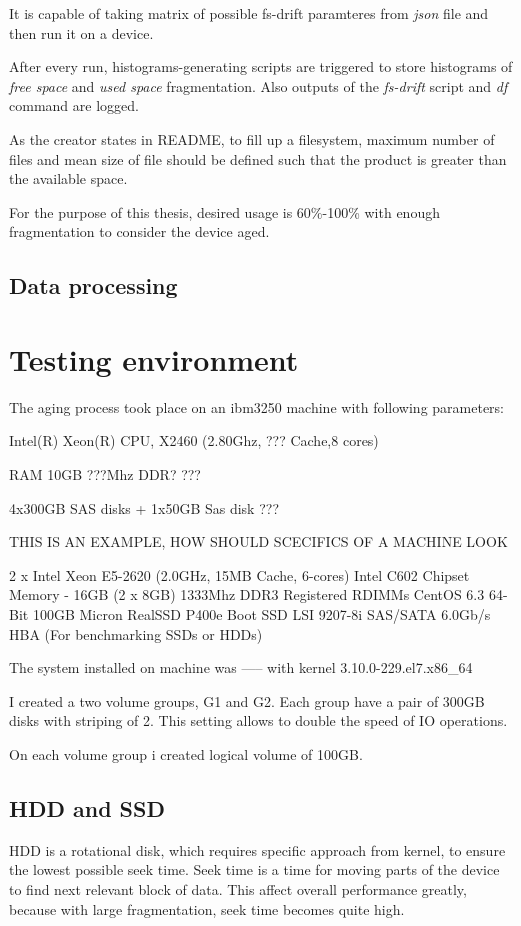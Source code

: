 \documentclass[
  color, %
  table, %
  lof,   %
  lot,   %
]{fithesis3}
\begin{document}
It is capable of taking matrix of possible fs-drift paramteres from \textit{json} file and then run it on a device.

After every run, histograms-generating scripts are triggered to store histograms of \textit{free space} and \textit{used space} fragmentation. Also outputs of the \textit{fs-drift} script and \textit{df} command are logged.

As the creator states in README, to fill up a filesystem, maximum number of files and mean size of file should be defined such that the product is greater than the available space.

For the purpose of this thesis, desired usage is 60\%-100\% with enough fragmentation to consider the device aged.

\section{Data processing}
\chapter{Testing environment}
The aging process took place on an ibm3250 machine with following parameters:
\begin{compactenum}
  \item Intel(R) Xeon(R) CPU, X2460 (2.80Ghz, ??? Cache,8 cores)
  \item RAM 10GB ???Mhz DDR? ???
  \item 4x300GB SAS disks + 1x50GB Sas disk ???
\end{compactenum}

THIS IS AN EXAMPLE, HOW SHOULD SCECIFICS OF A MACHINE LOOK

2 x Intel Xeon E5-2620 (2.0GHz, 15MB Cache, 6-cores)
Intel C602 Chipset
Memory - 16GB (2 x 8GB) 1333Mhz DDR3 Registered RDIMMs
 CentOS 6.3 64-Bit
100GB Micron RealSSD P400e Boot SSD
LSI 9207-8i SAS/SATA 6.0Gb/s HBA (For benchmarking SSDs or HDDs)

The system installed on machine was ----- with kernel 3.10.0-229.el7.x86\_64 

I created a two volume groups, G1 and G2. Each group have a pair of 300GB disks with striping of 2. This setting allows to double the speed of IO operations.

On each volume group i created logical volume of 100GB.
\section{HDD and SSD}
HDD is a rotational disk, which requires specific approach from kernel, to ensure the lowest possible seek time. Seek time is a time for moving parts of the device to find next relevant block of data. This affect overall performance greatly, because with large fragmentation, seek time becomes quite high.
\end{document}
